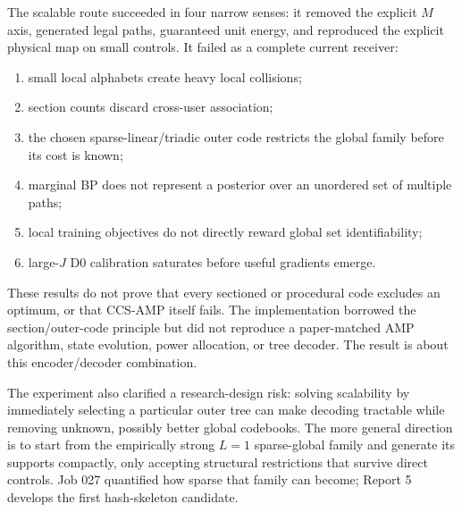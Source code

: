 \documentclass[11pt]{article}
\begin{document}
The scalable route succeeded in four narrow senses: it removed the explicit $M$ axis, generated legal paths, guaranteed
unit energy, and reproduced the explicit physical map on small controls. It failed as a complete current receiver:
\begin{enumerate}
 \item small local alphabets create heavy local collisions;
 \item section counts discard cross-user association;
 \item the chosen sparse-linear/triadic outer code restricts the global family before its cost is known;
 \item marginal BP does not represent a posterior over an unordered set of multiple paths;
 \item local training objectives do not directly reward global set identifiability;
 \item large-$J$ D0 calibration saturates before useful gradients emerge.
\end{enumerate}

These results do not prove that every sectioned or procedural code excludes an optimum, or that CCS-AMP itself fails.
The implementation borrowed the section/outer-code principle but did not reproduce a paper-matched AMP algorithm,
state evolution, power allocation, or tree decoder. The result is about this encoder/decoder combination.

The experiment also clarified a research-design risk: solving scalability by immediately selecting a particular outer
tree can make decoding tractable while removing unknown, possibly better global codebooks. The more general direction is
to start from the empirically strong $L=1$ sparse-global family and generate its supports compactly, only accepting
structural restrictions that survive direct controls. Job 027 quantified how sparse that family can become; Report 5
develops the first hash-skeleton candidate.
\end{document}
